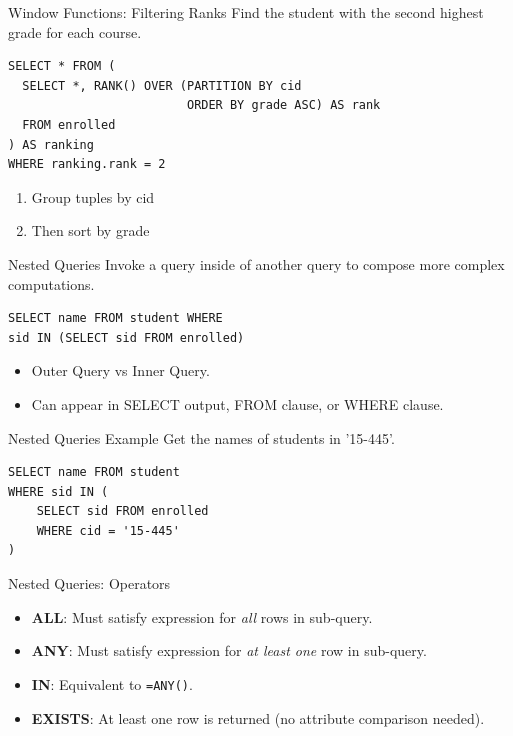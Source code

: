 \documentclass[aspectratio=169]{beamer}
\begin{document}
\begin{frame}[fragile]{Window Functions: Filtering Ranks}
    Find the student with the second highest grade for each course.
    
    \begin{lstlisting}
SELECT * FROM (
  SELECT *, RANK() OVER (PARTITION BY cid
                         ORDER BY grade ASC) AS rank
  FROM enrolled
) AS ranking
WHERE ranking.rank = 2
    \end{lstlisting}
    \begin{enumerate}
        \item Group tuples by cid
        \item Then sort by grade
    \end{enumerate}
\end{frame}

\begin{frame}[fragile]{Nested Queries}
    Invoke a query inside of another query to compose more complex computations.
    
    \begin{lstlisting}
SELECT name FROM student WHERE
sid IN (SELECT sid FROM enrolled)
    \end{lstlisting}
    
    \begin{itemize}
        \item Outer Query vs Inner Query.
        \item Can appear in SELECT output, FROM clause, or WHERE clause.
    \end{itemize}
\end{frame}

\begin{frame}[fragile]{Nested Queries Example}
    Get the names of students in '15-445'.
    
    \begin{lstlisting}
SELECT name FROM student
WHERE sid IN (
    SELECT sid FROM enrolled
    WHERE cid = '15-445'
)
    \end{lstlisting}
\end{frame}

\begin{frame}{Nested Queries: Operators}
    \begin{itemize}
        \item \textbf{ALL}: Must satisfy expression for \textit{all} rows in sub-query.
        \item \textbf{ANY}: Must satisfy expression for \textit{at least one} row in sub-query.
        \item \textbf{IN}: Equivalent to \texttt{=ANY()}.
        \item \textbf{EXISTS}: At least one row is returned (no attribute comparison needed).
    \end{itemize}
\end{frame}
\end{document}
